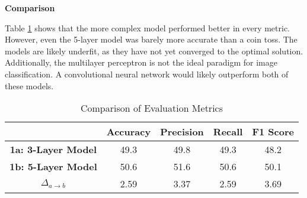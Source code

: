 \documentclass{article}
\begin{document}
\begin{enumerate}[label=1\alph*. ]
\textbf{Comparison}

Table \ref{tab:comparison1} shows that the more complex
model performed better in every metric. However, even the
5-layer model was barely more accurate than a coin toss. The
models are likely underfit, as they have not yet converged
to the optimal solution. Additionally, the multilayer
perceptron is not the ideal paradigm for image
classification. A convolutional neural network would likely
outperform both of these models.
\begin{table}[h]
    \centering
    \begin{tabular}{|c|c|c|c|c|}
        \hline
        & \textbf{Accuracy} & \textbf{Precision} & \textbf{Recall} & \textbf{F1 Score} \\
        \hline
        \textbf{1a: 3-Layer Model} & 49.3 & 49.8 & 49.3 & 48.2 \\
        \hline
        \textbf{1b: 5-Layer Model} & 50.6 & 51.6 & 50.6 & 50.1 \\
        \hline
        \textbf{\Large$\Delta_{a \rightarrow b}$} & 2.59 & 3.37 & 2.59 & 3.69 \\
        \hline
    \end{tabular}
    \caption{Comparison of Evaluation Metrics}
    \label{tab:comparison1}
\end{table}
\end{enumerate}
\end{document}
